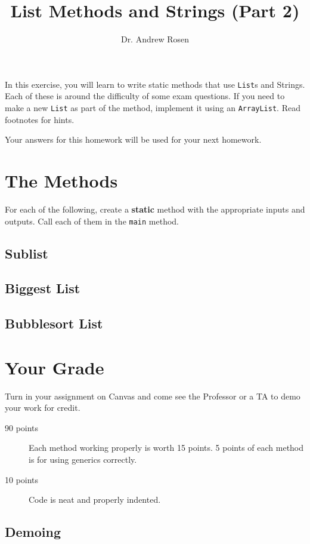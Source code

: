 \documentclass[10pt,letterpaper]{article}
\author{Dr. Andrew Rosen}
\title{List Methods and Strings (Part 2)}
\begin{document}
	
	\maketitle
	
	In this exercise, you will learn to write static methods that use \texttt{List}s and Strings.
	Each of these is around the difficulty of some exam questions.
	If you need to make a new \texttt{List} as part of the method, implement it using an \texttt{ArrayList}.
	Read footnotes for hints.
	
	Your answers for this homework will be used for your next homework.
	
	\newpage
	
	
	\newpage
	\section{The Methods}
	For each of the following, create a \textbf{static} method with the appropriate inputs and outputs.
	Call each of them in the \texttt{main} method.
	
	\subsection{Sublist}
	
	
	\subsection{Biggest List}
	
	\subsection{Bubblesort List}
	
	\section{Your Grade}
	Turn in your assignment on Canvas and come see the Professor or a TA to demo your work for credit.
	
	\begin{description}
		\item[90 points] Each method working properly is worth 15 points.  5 points of each method is for using generics correctly.
		\item[10 points] Code is neat and properly indented.
		
	\end{description}


	\subsection{Demoing}
	
\end{document}
